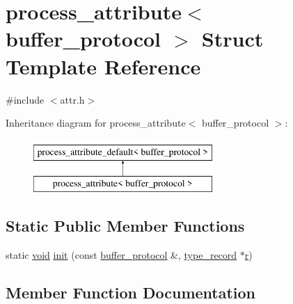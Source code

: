 \hypertarget{structprocess__attribute_3_01buffer__protocol_01_4}{}\section{process\+\_\+attribute$<$ buffer\+\_\+protocol $>$ Struct Template Reference}
\label{structprocess__attribute_3_01buffer__protocol_01_4}


{\ttfamily \#include $<$attr.\+h$>$}

Inheritance diagram for process\+\_\+attribute$<$ buffer\+\_\+protocol $>$\+:\begin{figure}[H]
\begin{center}
\leavevmode
\includegraphics[height=2.000000cm]{structprocess__attribute_3_01buffer__protocol_01_4}
\end{center}
\end{figure}
\subsection*{Static Public Member Functions}
\begin{DoxyCompactItemize}
\item 
static \mbox{\hyperlink{_s_d_l__opengles2__gl2ext_8h_ae5d8fa23ad07c48bb609509eae494c95}{void}} \mbox{\hyperlink{structprocess__attribute_3_01buffer__protocol_01_4_a15cc2af454588e0d1e88699a80a05081}{init}} (const \mbox{\hyperlink{structbuffer__protocol}{buffer\+\_\+protocol}} \&, \mbox{\hyperlink{structtype__record}{type\+\_\+record}} $\ast$\mbox{\hyperlink{_s_d_l__opengl_8h_a42ce7cdc612e53abee15043f80220d97}{r}})
\end{DoxyCompactItemize}


\subsection{Member Function Documentation}
\mbox{\label{structprocess__attribute_3_01buffer__protocol_01_4_a15cc2af454588e0d1e88699a80a05081}} 
